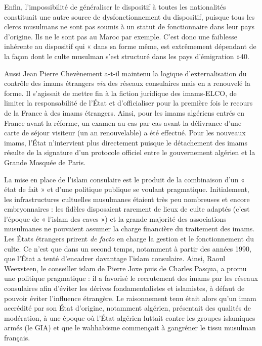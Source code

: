 Enfin, l'impossibilité de généraliser le dispositif à toutes les
nationalités constituait une autre source de dysfonctionnement du
dispositif, puisque tous les clercs musulmans ne sont pas soumis à un
statut de fonctionnaire dans leur pays d'origine. Ils ne le sont pas au
Maroc par exemple. C'est donc une faiblesse inhérente au dispositif qui
« dans sa forme même, est extrêmement dépendant de la façon dont le
culte musulman s'est structuré dans les pays d'émigration »40.

Aussi Jean Pierre Chevènement a-t-il maintenu la logique
d'externalisation du contrôle des imams étrangers \emph{via} des réseaux
consulaires mais en a renouvelé la forme. Il s'agissait de mettre fin à
la fiction juridique des imams-ELCO, de limiter la responsabilité de
l'État et d'officialiser pour la première fois le recours de la France à
des imams étrangers. Ainsi, pour les imams algériens entrés en France
avant la réforme, un examen au cas par cas avant la délivrance d'une
carte de séjour visiteur (un an renouvelable) a été effectué. Pour les
nouveaux imams, l'État n'intervient plus directement puisque le
détachement des imams résulte de la signature d'un protocole officiel
entre le gouvernement algérien et la Grande Mosquée de Paris.

La mise en place de l'islam consulaire est le produit de la combinaison
d'un « état de fait » et d'une politique publique se voulant pragmatique.
Initialement, les infrastructures cultuelles musulmanes étaient très peu
nombreuses et encore embryonnaires : les fidèles disposaient rarement de
lieux de culte adaptés (c'est l'époque de « l'islam des caves ») et la
grande majorité des associations musulmanes ne pouvaient assumer la
charge financière du traitement des imams. Les États étrangers prirent
\emph{de facto} en charge la gestion et le fonctionnement du culte. Ce
n'est que dans un second temps, notamment à partir des années 1990, que
l'État a tenté d'encadrer davantage l'islam consulaire. Ainsi, Raoul
Weexsteen, le conseiller islam de Pierre Joxe puis de Charles Pasqua, a
promu une politique pragmatique : il a favorisé le recrutement des imams
par les réseaux consulaires afin d'éviter les dérives fondamentalistes
et islamistes, à défaut de pouvoir éviter l'influence étrangère. Le
raisonnement tenu était alors qu'un imam accrédité par son État
d'origine, notamment algérien, présentait des qualités de modération, à
une époque où l'État algérien luttait contre les groupes islamiques
armés (le GIA) et que le wahhabisme commençait à gangréner le tissu
musulman français.

